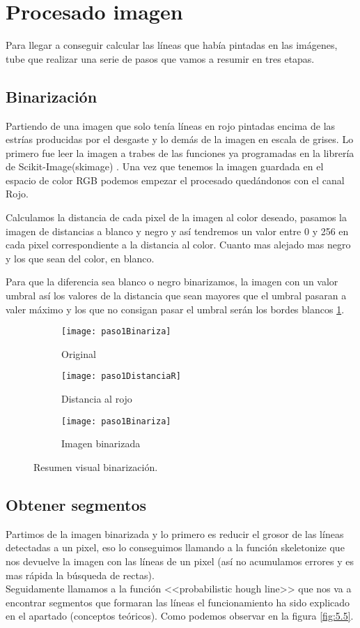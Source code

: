 \section{Procesado imagen}
Para llegar a conseguir calcular las líneas que había pintadas en las imágenes, tube que realizar una serie de pasos que vamos a resumir en tres etapas.
\subsection{Binarización}
Partiendo de una imagen que solo tenía líneas en rojo pintadas encima de las estrías producidas por el desgaste y lo demás de la imagen en escala de grises. Lo primero fue leer la imagen a trabes de las funciones ya programadas en la librería de Scikit-Image(skimage) \cite{scik:skeleton}.
Una vez que tenemos la imagen guardada en el espacio de color RGB podemos empezar el procesado quedándonos con el canal Rojo.

Calculamos la distancia de cada pixel de la imagen al color deseado, pasamos la imagen de distancias a blanco y negro y así tendremos un valor entre 0 y 256 en cada pixel correspondiente a la distancia al color. Cuanto mas alejado mas negro y los que sean del color, en blanco.

Para que la diferencia sea blanco o negro binarizamos, la imagen con un valor umbral así los valores de la distancia que sean mayores que el umbral pasaran a valer máximo y los que no consigan pasar el umbral serán los bordes blancos \ref{fig:5.4}.


\begin{figure}
\begin{subfigure}[c]{.5\linewidth}
\centering\large \texttt{[image: paso1Binariza]}
\caption{Original}
\end{subfigure}%
\begin{subfigure}[c]{.5\linewidth}
\centering\large \texttt{[image: paso1DistanciaR]}
\caption{Distancia al rojo}
\end{subfigure}
\begin{subfigure}[c]{.5\linewidth}
\centering\large \texttt{[image: paso1Binariza]}
\caption{Imagen binarizada}
\end{subfigure}
\caption{Resumen visual binarización.}\label{fig:5.4}
\end{figure}


\subsection{Obtener segmentos}
Partimos de la imagen binarizada y lo primero es reducir el grosor de las líneas detectadas a un pixel, eso lo conseguimos llamando a la función skeletonize que nos devuelve la imagen con las líneas de un pixel (así no acumulamos errores y es mas rápida la búsqueda de rectas).\\
Seguidamente llamamos a la función <<probabilistic hough line>> que nos va a encontrar segmentos que formaran las líneas el funcionamiento ha sido explicado en el apartado (conceptos teóricos). Como podemos observar en la figura \ref{fig:5.5}.


